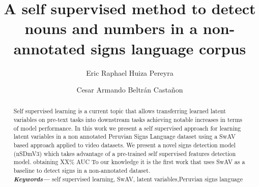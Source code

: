 \documentclass[twocolumn,conference]{article}
\providecommand{\keywords}[1]
{
  \small	
  \textbf{\textit{Keywords---}} #1
}
\begin{document}
\author[1]{Eric Raphael Huiza Pereyra}

\author[2]{Cesar Armando Beltrán Castañon}

\title{%
	\vspace{-2.0cm}
	\textbf{A self supervised method to detect nouns and numbers in a non-annotated signs language corpus} 
}

\maketitle
    
\begin{abstract}
Self supervised learning is a current topic that allows transferring learned latent variables on pre-text tasks into downstream tasks achieving notable increases in terms of model performance. In this work we present a self supervised approach for learning latent variables in a non annotated Peruvian Signs Language dataset using a SwAV based approach applied to video datasets. We present a novel signs detection model (nSDmV3) which takes advantage of a pre-trained self supervised features detection model. obtaining XX\% AUC To our knowledge it is the first work that uses SwAV as a baseline to detect signs in a non-annotated dataset. 
\\
\keywords{self supervised learning, SwAV, latent variables,Peruvian signs language}
\end{abstract}
\end{document}

